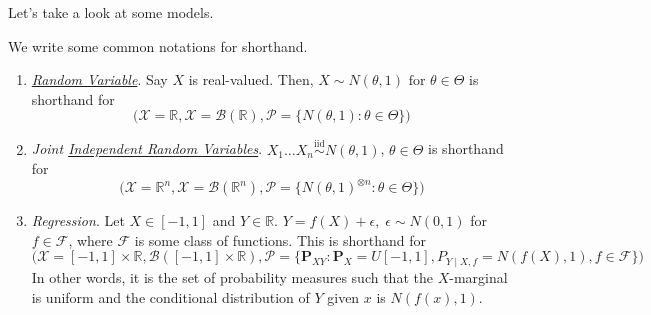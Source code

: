   Let's take a look at some models. 

  \begin{example}
    \label{ex:notation-for-random-variables-and-models}
    We write some common notations for shorthand. 
    \begin{enumerate}
      \item \textit{\hyperref[prob-def:random-variable]{Random Variable}}. Say $X$ is real-valued. Then, $X \sim N(\theta, 1) \text{ for } \theta \in \Theta$ is shorthand for 
        \begin{equation}
          \big( \mathcal{X} = \mathbb{R}, \mathscr{X} = \mathcal{B}(\mathbb{R}), \mathcal{P} = \{N(\theta, 1) \colon \theta \in \Theta\}  \big)
        \end{equation}

      \item \textit{Joint \hyperref[prob-def:independent-random-variables]{Independent Random Variables}}. $X_1 \ldots X_n \overset{\text{iid}}{\sim} N(\theta, 1)$, $\theta \in \Theta$ is shorthand for 
        \begin{equation}
          \big( \mathcal{X} = \mathbb{R}^n, \mathscr{X} = \mathcal{B}(\mathbb{R}^n), \mathcal{P} = \{N(\theta, 1)^{\otimes n} \colon \theta \in \Theta\} \big)
        \end{equation}

      \item \textit{Regression}. Let $X \in [-1, 1]$ and $Y \in \mathbb{R}$. $Y = f(X) + \epsilon, \; \epsilon \sim N(0, 1)$ for $f \in \mathcal{F}$, where $\mathcal{F}$ is some class of functions. This is shorthand for 
        \begin{equation}
          \big( \mathcal{X} = [-1, 1] \times \mathbb{R}, \mathcal{B}([-1, 1] \times \mathbb{R}), \mathcal{P} = \{\mathbf{P}_{XY} \colon \mathbf{P}_X = U[-1, 1], P_{Y \mid X, f} = N(f(X), 1), f \in \mathcal{F} \}\big)
        \end{equation}
        In other words, it is the set of probability measures such that the $X$-marginal is uniform and the conditional distribution of $Y$ given $x$ is $N(f(x), 1)$. 


\end{enumerate}
\end{example}
